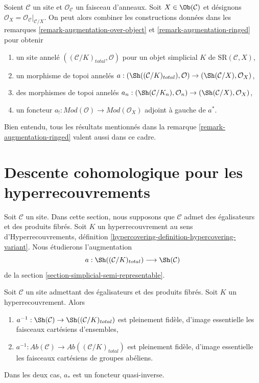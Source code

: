 \begin{remark}
\label{remark-augmentation-ringed-over-object}
Soient $\mathcal{C}$ un site et $\mathcal{O}_\mathcal{C}$ un faisceau d'anneaux.
Soit $X \in \Ob(\mathcal{C})$ et désignons
$\mathcal{O}_X = \mathcal{O}_\mathcal{C}|_{\mathcal{C}/X}$.
On peut alors combiner les constructions données dans les
remarques \ref{remark-augmentation-over-object} et
\ref{remark-augmentation-ringed}
pour obtenir
\begin{enumerate}
\item un site annelé $((\mathcal{C}/K)_{total}, \mathcal{O})$
pour un objet simplicial $K$ de $\text{SR}(\mathcal{C}, X)$,
\item un morphisme de topoi annelés
$a : (\Sh((\mathcal{C}/K)_{total}), \mathcal{O}) \to
(\Sh(\mathcal{C}/X), \mathcal{O}_X)$,
\item des morphismes de topoi annelés
$a_n : (\Sh(\mathcal{C}/K_n), \mathcal{O}_n) \to
(\Sh(\mathcal{C}/X), \mathcal{O}_X)$,
\item un foncteur
$a_! : \textit{Mod}(\mathcal{O}) \to \textit{Mod}(\mathcal{O}_X)$
adjoint à gauche de $a^*$.
\end{enumerate}
Bien entendu, tous les résultats mentionnés dans la remarque
\ref{remark-augmentation-ringed}
valent aussi dans ce cadre.
\end{remark}






\section{Descente cohomologique pour les hyperrecouvrements}
\label{section-cohomological-descent-hypercoverings}

\noindent
Soit $\mathcal{C}$ un site. Dans cette section, nous supposons que $\mathcal{C}$
admet des égalisateurs et des produits fibrés. Soit $K$ un hyperrecouvrement
au sens d'Hyperrecouvrements, définition
\ref{hypercovering-definition-hypercovering-variant}. Nous étudierons
l'augmentation
$$
a : \Sh((\mathcal{C}/K)_{total}) \longrightarrow \Sh(\mathcal{C})
$$
de la section \ref{section-simplicial-semi-representable}.

\begin{lemma}
\label{lemma-hypercovering-descent-sheaves}
Soit $\mathcal{C}$ un site admettant des égalisateurs et des produits fibrés.
Soit $K$ un hyperrecouvrement. Alors
\begin{enumerate}
\item $a^{-1} : \Sh(\mathcal{C}) \to \Sh((\mathcal{C}/K)_{total})$
est pleinement fidèle, d'image essentielle les faisceaux cartésiens d'ensembles,
\item $a^{-1} : \textit{Ab}(\mathcal{C}) \to
\textit{Ab}((\mathcal{C}/K)_{total})$
est pleinement fidèle, d'image essentielle les faisceaux cartésiens
de groupes abéliens.
\end{enumerate}
Dans les deux cas, $a_*$ est un foncteur quasi-inverse.
\end{lemma}

